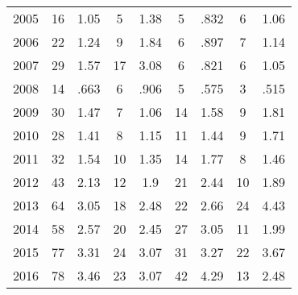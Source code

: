 \begin{table}[htbp]
\begin{tabular}{l*{8}{c}}
2005      &       16&     1.05&        5&     1.38&        5&     .832&        6&     1.06\\
2006      &       22&     1.24&        9&     1.84&        6&     .897&        7&     1.14\\
2007      &       29&     1.57&       17&     3.08&        6&     .821&        6&     1.05\\
2008      &       14&     .663&        6&     .906&        5&     .575&        3&     .515\\
2009      &       30&     1.47&        7&     1.06&       14&     1.58&        9&     1.81\\
2010      &       28&     1.41&        8&     1.15&       11&     1.44&        9&     1.71\\
2011      &       32&     1.54&       10&     1.35&       14&     1.77&        8&     1.46\\
2012      &       43&     2.13&       12&      1.9&       21&     2.44&       10&     1.89\\
2013      &       64&     3.05&       18&     2.48&       22&     2.66&       24&     4.43\\
2014      &       58&     2.57&       20&     2.45&       27&     3.05&       11&     1.99\\
2015      &       77&     3.31&       24&     3.07&       31&     3.27&       22&     3.67\\
2016      &       78&     3.46&       23&     3.07&       42&     4.29&       13&     2.48\\
\hline\hline
\end{tabular}
\end{table}
